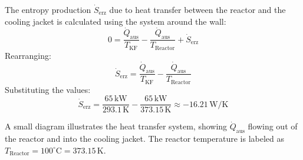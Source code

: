 The entropy production \( \dot{S}_{\text{erz}} \) due to heat transfer between the reactor and the cooling jacket is calculated using the system around the wall:  
\[
0 = \frac{\dot{Q}_{\text{aus}}}{T_{\text{KF}}} - \frac{\dot{Q}_{\text{aus}}}{T_{\text{Reactor}}} + \dot{S}_{\text{erz}}
\]  
Rearranging:  
\[
\dot{S}_{\text{erz}} = \frac{\dot{Q}_{\text{aus}}}{T_{\text{KF}}} - \frac{\dot{Q}_{\text{aus}}}{T_{\text{Reactor}}}
\]  
Substituting the values:  
\[
\dot{S}_{\text{erz}} = \frac{65 \, \text{kW}}{293.1 \, \text{K}} - \frac{65 \, \text{kW}}{373.15 \, \text{K}} \approx -16.21 \, \text{W/K}
\]  

A small diagram illustrates the heat transfer system, showing \( \dot{Q}_{\text{aus}} \) flowing out of the reactor and into the cooling jacket. The reactor temperature is labeled as \( T_{\text{Reactor}} = 100^\circ\text{C} = 373.15 \, \text{K} \).